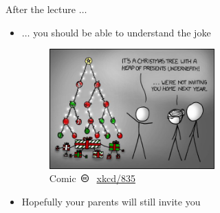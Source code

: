 \begin{frame}{After the lecture $\ldots$}
  \begin{itemize}
    \item
      $\ldots$ you should be able to understand the joke
      \begin{figure}[!h]
        \begin{center}
          \includegraphics[width=0.6\textwidth]{Images/Jokes/Tree.jpg}
        \end{center}
        \caption{%
          Comic~\includegraphics[height=0.8em]{Images/Copyright/cc.png}~%
          \href{https://xkcd.com/835/}{\color{MainA}xkcd/835}}%
        \label{fig:introduction:joke_tree}
      \end{figure}
    \item<2- |handout:1>
       Hopefully your parents will still invite you
  \end{itemize}
\end{frame}